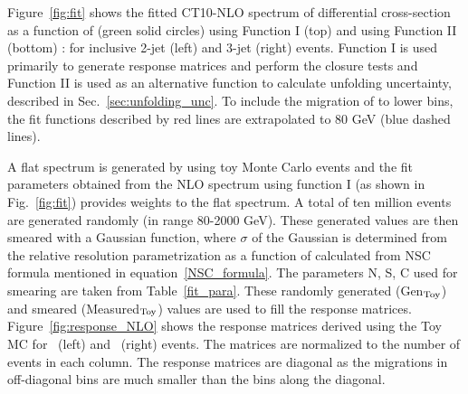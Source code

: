Figure~\ref{fig:fit} shows the fitted CT10-NLO spectrum of differential cross-section as a function of \httwo (green solid circles) using Function I (top) and using Function II (bottom) : for inclusive 2-jet (left) and 3-jet (right) events. Function I is used primarily to generate response matrices and perform the closure tests and Function II is used as an alternative function to calculate unfolding uncertainty, described in Sec.~\ref{sec:unfolding_unc}. To include the migration of \httwo to lower bins, the fit functions described by red lines are extrapolated to 80 GeV (blue dashed lines).

A flat \httwo spectrum is generated by using toy Monte Carlo events and the fit parameters obtained from the NLO spectrum using function I (as shown in Fig.~\ref{fig:fit}) provides weights to the flat spectrum. A total of ten million events are generated randomly (in \httwo range 80-2000 GeV). These generated values are then smeared with a Gaussian function, where $\sigma$ of the Gaussian is determined from the relative resolution parametrization as a function of \httwo calculated from NSC formula mentioned in equation~\ref{NSC_formula}. The parameters N, S, C used for smearing are taken from Table~\ref{fit_para}. These randomly generated (Gen$_{\rm Toy}$) and smeared (Measured$_{\rm Toy}$) values are used to fill the response matrices. Figure~\ref{fig:response_NLO} shows the response matrices derived using the Toy MC for \njt~(left) and \njth~(right) events. The matrices are normalized to the number of events in each column. The response matrices are diagonal as the migrations in off-diagonal bins are much smaller than the bins along the diagonal.

